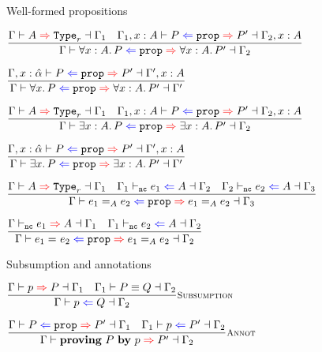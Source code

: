 \begin{frame}{Well-formed propositions}

\begin{center}
  $\infrule{\inferkind{\Gamma}{A}[r]{\Gamma_1} \quad \checkprop{\extend{\Gamma_1}{x}{A}}{P}{P'}{\extend{\Gamma_2}{x}{A}}}{\checkprop{\Gamma}{\All{x}[A]{P}}{\All{x}[A]{P'}}{\Gamma_2}}$

  \vspace{1em}

  $\infrule{\checkprop{\extend{\Gamma}{x}{\hat{\alpha}}}{P}{P'}{\extend{\Gamma'}{x}{A}}}{\checkprop{\Gamma}{\All{x}{P}}{\All{x}[A]{P'}}{\Gamma'}}$

  \vspace{1em}

  $\infrule{\inferkind{\Gamma}{A}[r]{\Gamma_1} \quad \checkprop{\extend{\Gamma_1}{x}{A}}{P}{P'}{\extend{\Gamma_2}{x}{A}}}{\checkprop{\Gamma}{\Ex{x}[A]{P}}{\Ex{x}[A]{P'}}{\Gamma_2}}$

  \vspace{1em}

  $\infrule{\checkprop{\extend{\Gamma}{x}{\hat{\alpha}}}{P}{P'}{\extend{\Gamma'}{x}{A}}}{\checkprop{\Gamma}{\Ex{x}{P}}{\Ex{x}[A]{P'}}{\Gamma'}}$

  \vspace{1em}

  $\infrule{\inferkind{\Gamma}{A}[r]{\Gamma_1} \quad \checktype{\Gamma_1}[\noncomputable]{e_1}{A}{\Gamma_2} \quad \checktype{\Gamma_2}[\noncomputable]{e_2}{A}{\Gamma_3}}{\checkprop{\Gamma}{\Eq[A]{e_1}{e_2}}{\Eq[A]{e_1}{e_2}}{\Gamma_3}}$

  \vspace{1em}

  $\infrule{\infertype{\Gamma}[\noncomputable]{e_1}{A}{\Gamma_1} \quad \checktype{\Gamma_1}[\noncomputable]{e_2}{A}{\Gamma_2}}{\checkprop{\Gamma}{\Eq{e_1}{e_2}}{\Eq[A]{e_1}{e_2}}{\Gamma_2}}$
\end{center}

\end{frame}

\begin{frame}{Subsumption and annotations}

\begin{center}
  $\infrule[Subsumption]{\inferproof{\Gamma}{p}{P}{\Gamma_1} \quad \checkpropconv{\Gamma_1}{P}{Q}{\Gamma_2}}{\checkproof{\Gamma}{p}{Q}{\Gamma_2}}$

  \vspace{2em}

  $\infrule[Annot]{\checkprop{\Gamma}{P}{P'}{\Gamma_1} \quad \checkproof{\Gamma_1}{p}{P'}{\Gamma_2}}{\inferproof{\Gamma}{\proving{P}{p}}{P'}{\Gamma_2}}$
\end{center}

\end{frame}

